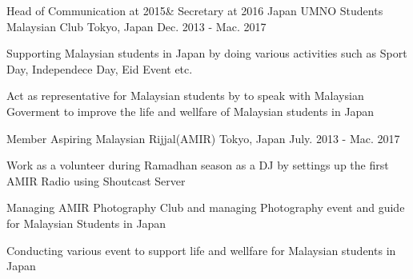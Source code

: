 

\begin{cventries}

  \cventry
    {Head of Communication  at 2015\& Secretary at 2016} %
    {Japan UMNO Students Malaysian Club} %
    {Tokyo, Japan} %
    {Dec. 2013 - Mac. 2017} %
    {
      \begin{cvitems} %
        \item {Supporting Malaysian students in Japan by doing various activities such as Sport Day, Independece Day, Eid Event etc.}
        \item {Act as representative for Malaysian students by to speak with Malaysian Goverment to improve the life and wellfare of Malaysian students
			in Japan}
      \end{cvitems}
    }

  \cventry
    {Member} %
	{Aspiring Malaysian Rijjal(AMIR)} %
    {Tokyo, Japan} %
    {July. 2013 - Mac. 2017} %
    {
      \begin{cvitems} %
        \item {Work as a volunteer during Ramadhan season as a DJ by settings up the first AMIR Radio using Shoutcast Server}
        \item {Managing AMIR Photography Club and managing Photography event and guide for Malaysian Students in Japan}
        \item {Conducting various event to support life and wellfare for Malaysian students in Japan}
      \end{cvitems}
    }

\end{cventries}

